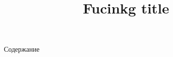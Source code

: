 \documentclass{beamer}
\title{Fucinkg title}
\date{}
\begin{document}
\begin{frame}
	\maketitle
\end{frame}

\begin{frame}[allowframebreaks]{Содержание}
	\tableofcontents
\end{frame}
\end{document}
